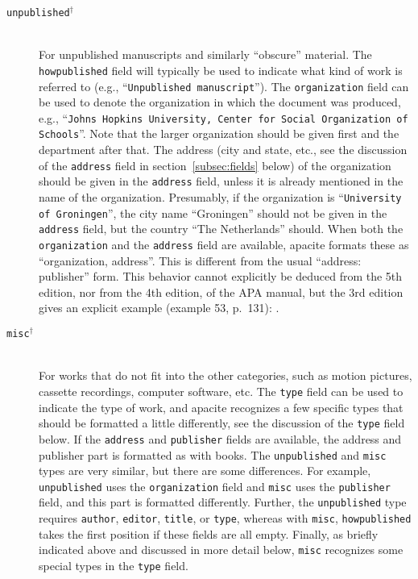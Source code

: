 \documentclass{article}
\newcommand{\LC}{\mbox{${}^{\dag}$}}%
\newcommand{\pkg}[1]{\textsf{#1}}%
\newcommand{\fieldname}[1]{\texttt{#1}}%
\newcommand{\entryname}[1]{\texttt{#1}}%
\begin{document}
\begin{description}
    \item[\entryname{unpublished}\LC] \mbox{}\\
         For unpublished manuscripts and similarly ``obscure'' material.
         The \fieldname{howpublished} field will typically be used to
         indicate what kind of work is referred to (e.g.,
         ``\verb+Unpublished manuscript+''). The \fieldname{organization}
         field can be used to denote the organization in which the document
         was produced, e.g., ``\texttt{Johns Hopkins University, Center
         for Social Organization of Schools}''. Note that the larger
         organization should be given first and the department after that.
         The address (city and state, etc., see the discussion of the
         \fieldname{address} field in section~\ref{subsec:fields} below)
         of the organization should be given in the \fieldname{address}
         field, unless it is already mentioned in the name of the
         organization. Presumably, if the organization is
         ``\verb+University of Groningen+'', the city name ``Groningen''
         should not be given in the \fieldname{address} field, but
         the country ``The Netherlands'' should. When both the
         \fieldname{organization} and the \fieldname{address} field
         are available, \pkg{apacite} formats these as
         ``organization, address''. This is different from the
         usual ``address: publisher'' form. This behavior cannot
         explicitly be deduced from the 5th edition, nor from the
         4th edition, of the APA manual, but the 3rd edition
         \cite{APAManual3} gives an explicit example (example 53,
         p.~131): .

    \item[\entryname{misc}\LC] \mbox{}\\
        For works that do not fit into the other categories, such as
        motion pictures, cassette recordings, computer software, etc.
        The \fieldname{type} field can be used to indicate the type
        of work, and \pkg{apacite} recognizes a few specific types
        that should be formatted a little differently, see the discussion
        of the \fieldname{type} field below. If the \fieldname{address}
        and \fieldname{publisher} fields are available, the address and
        publisher part is formatted as with books. The \entryname{unpublished}
        and \entryname{misc} types are very similar, but there are some
        differences. For example, \entryname{unpublished} uses the
        \entryname{organization} field and \entryname{misc} uses the
        \fieldname{publisher} field, and this part is formatted differently.
        Further, the \entryname{unpublished} type requires
        \fieldname{author}, \fieldname{editor}, \fieldname{title}, or
        \fieldname{type}, whereas with \fieldname{misc},
        \fieldname{howpublished} takes the first position if these fields
        are all empty. Finally, as briefly indicated above and discussed
        in more detail below, \entryname{misc} recognizes some special
        types in the \fieldname{type} field.


\end{description}
\end{document}
